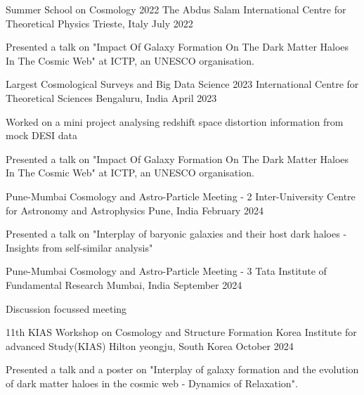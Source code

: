 \begin{cventries}

{
\cventry
{Summer School on Cosmology 2022}
{The Abdus Salam International Centre for Theoretical Physics}
{Trieste, Italy}
{July 2022}
{
\begin{cvitems}
\item {Presented a talk on "Impact Of Galaxy Formation On The Dark Matter Haloes In The Cosmic Web" at ICTP, an UNESCO organisation.}
\end{cvitems}
}
}

{
\cventry
{Largest Cosmological Surveys and Big Data Science 2023}
{International Centre for Theoretical Sciences}
{Bengaluru, India}
{April 2023}
{
\begin{cvitems}
\item {Worked on a mini project analysing redshift space distortion information from mock DESI data}
\item {Presented a talk on "Impact Of Galaxy Formation On The Dark Matter Haloes In The Cosmic Web" at ICTP, an UNESCO organisation.}
\end{cvitems}
}
}


{
\cventry
{Pune-Mumbai Cosmology and Astro-Particle Meeting - 2}
{Inter-University Centre for Astronomy and Astrophysics}
{Pune, India}
{February 2024}
{
\begin{cvitems}
\item {Presented a talk on "Interplay of baryonic galaxies and their host dark haloes - Insights from self-similar analysis"}
\end{cvitems}
}
}

{
\cventry
{Pune-Mumbai Cosmology and Astro-Particle Meeting - 3}
{Tata Institute of Fundamental Research}
{Mumbai, India}
{September 2024}
{
\begin{cvitems}
\item {Discussion focussed meeting}
\end{cvitems}
}
}

{
\cventry
{11th KIAS Workshop on Cosmology and Structure Formation}
{Korea Institute for advanced Study(KIAS)}
{Hilton yeongju, South Korea}
{October 2024}
{
\begin{cvitems}
\item {Presented a talk and a poster on "Interplay of galaxy formation and the evolution of dark matter haloes in the cosmic web - Dynamics of Relaxation".}
\end{cvitems}
}
}




\end{cventries}

